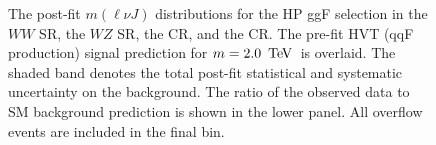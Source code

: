 \begin{figure}[htb]
\caption[Post-fit $m(\ell\nu J)$ distribution for high purity, gluon-gluon fusion selection]{The post-fit $m(\ell\nu J)$ distributions for the HP ggF selection in \protect{} the $WW$ SR, \protect{} the $WZ$ SR, \protect{} the \Wjets CR, and   \protect{} the \ttbar CR. The pre-fit HVT (qqF production) signal prediction for $m=2.0\,\TeV$\, is overlaid. The shaded band denotes the total post-fit statistical and systematic uncertainty on the background. The ratio of the observed data to SM background prediction is shown in the lower panel. All overflow events are included in the final bin.}
\label{fig:pf_hp_ggf}
\end{figure}

\begin{figure}[htb]
\centering
{}
\\

\end{figure}
